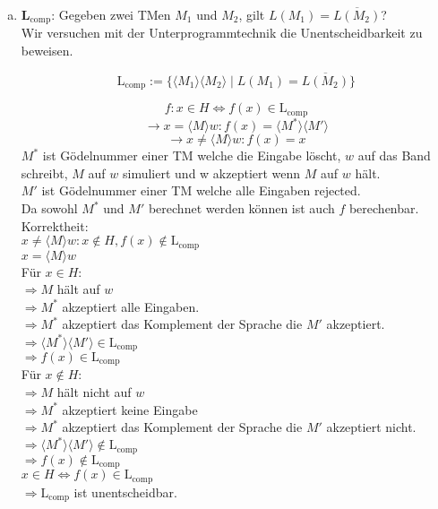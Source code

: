 \begin{enumerate}[(a)]
	\item $\textbf{L}_\text{comp}$: Gegeben zwei TMen $M_1$ und $M_2$, gilt $L(M_1) = \overline{L(M_2)}$?\\
	Wir versuchen mit der Unterprogrammtechnik die Unentscheidbarkeit zu beweisen.
	
	$$\text{L}_\text{comp} := \{ \langle M_1 \rangle \langle M_2 \rangle \mid L(M_1) = \overline{L(M_2)} \}$$
	
	$$f : x \in H \Leftrightarrow f(x) \in \text{L}_\text{comp}$$
	$$\rightarrow x = \langle M \rangle w : f(x) = \langle M^{*} \rangle \langle M' \rangle$$
	$$\rightarrow x \neq \langle M \rangle w : f (x) = x$$
$M^*$ ist Gödelnummer einer TM welche die Eingabe löscht, $w$ auf das Band schreibt, $M$ auf $w$ simuliert und w akzeptiert wenn $M$ auf $w$ hält.\\
$M'$ ist Gödelnummer einer TM welche alle Eingaben rejected.\\
Da sowohl $M^*$ und $M'$ berechnet werden können ist auch $f$ berechenbar.\\
Korrektheit:\\
$x \neq \langle M \rangle w : x \notin H , f(x) \notin \text{L}_\text{comp}$\\
$x= \langle M \rangle w $\\
Für $ x \in H$:\\
$\Rightarrow M$ hält auf $w$\\
$\Rightarrow M^*$ akzeptiert alle Eingaben.\\
$\Rightarrow M^*$ akzeptiert das Komplement der Sprache die $M'$ akzeptiert.\\
$\Rightarrow \langle M^* \rangle \langle M' \rangle \in \text{L}_\text{comp}$\\
$\Rightarrow f(x) \in \text{L}_\text{comp}$\\
Für $x \notin H$:\\
$\Rightarrow M$ hält nicht auf $w$\\
$\Rightarrow M^*$ akzeptiert keine Eingabe\\
$\Rightarrow M^*$ akzeptiert das Komplement der Sprache die $M'$ akzeptiert nicht.\\
$\Rightarrow \langle M^* \rangle \langle M' \rangle \notin \text{L}_\text{comp}$\\
$\Rightarrow f(x) \notin \text{L}_\text{comp}$\\
	
$x \in H \Leftrightarrow f(x) \in \text{L}_\text{comp}$\\
$\Rightarrow \text{L}_\text{comp}$ ist unentscheidbar.
	
	
\end{enumerate}

